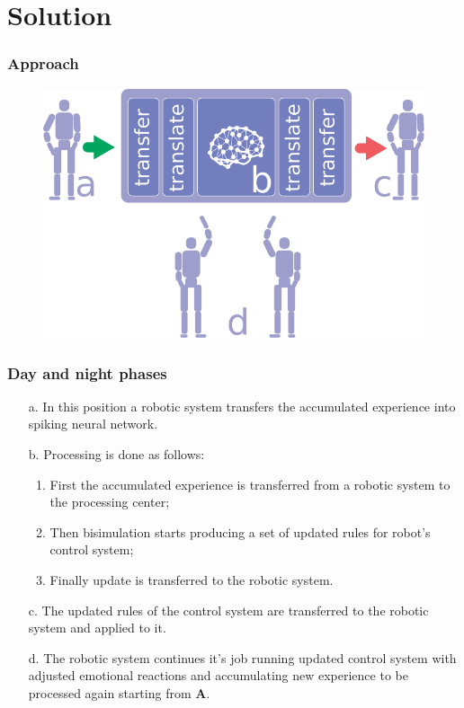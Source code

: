 \documentclass[12pt]{beamer}
\begin{document}
\section{Solution}

\begin{frame}
\frametitle{Approach}
\begin{figure}
\includegraphics[width=1.0\linewidth]{robot-dream}
\end{figure}
\end{frame}


\begin{frame}
\frametitle{Day and night phases}

\begin{enumerate}
  \item[a.] In this position a robotic system transfers the accumulated experience into spiking neural network.
  \item[b.] Processing is done as follows:
      \begin{enumerate}
      \item First the accumulated experience is transferred from a robotic system to the processing center;
      \item Then bisimulation starts producing a set of updated rules for robot's control system;
      \item Finally update is transferred to the robotic system.
      \end{enumerate}
  \item[c.] The updated rules of the control system are transferred to the robotic system and applied to it.
  \item[d.] The robotic system continues it's job running updated control system with adjusted emotional reactions and accumulating new experience to be processed again starting from \textbf{A}.
  \end{enumerate}

\end{frame}
\end{document}
